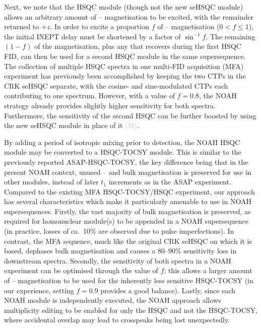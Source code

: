 \documentclass[11pt]{article}
\newcommand*{\carbon}{\ce{^{13}C}}
\newcommand*{\proton}{\ce{^{1}H}}
\newcommand*{\hl}[1]{\textcolor{Thistle}{#1}}
\newcommand*{\sitodo}{\hl{(SI)}}
\begin{document}
Next, we note that the HSQC module (though not the new seHSQC module) allows an arbitrary amount of \carbon{}--\proton{} magnetisation to be excited, with the remainder returned to $+z$.  In order to excite a proportion $f$ of \carbon{}--\proton{} magnetisation ($0 < f \leq 1$), the initial INEPT delay must be shortened by a factor of $\sin^{-1}f$.
The remaining $(1 - f)$ of the magnetisation, plus any that recovers during the first HSQC FID, can then be used for a second HSQC module in the same supersequence.
The collection of multiple HSQC spectra in one multi-FID acquisition (MFA) experiment has previously been accomplished by keeping the two CTPs in the CRK seHSQC separate, with the cosine- and sine-modulated CTPs each contributing to one spectrum.\autocite{ctphsqc}
However, with a value of $f = 0.8$, the NOAH strategy already provides slightly higher sensitivity for both spectra.
Furthermore, the sensitivity of the second HSQC can be further boosted by using the new seHSQC module in place of it \sitodo{}.

By adding a period of isotropic mixing prior to detection, the NOAH HSQC module may be converted to a HSQC-TOCSY module.
This is similar to the previously reported ASAP-HSQC-TOCSY,\autocite{Becker2019JMR} the key difference being that in the present NOAH context, unused \carbon{}--\proton{} and bulk magnetisation is preserved for use in other modules, instead of later $t_1$ increments as in the ASAP experiment.
Compared to the existing MFA HSQC-TOCSY/HSQC experiment,\autocite{Nolis2019CPC} our approach has several characteristics which make it particularly amenable to use in NOAH supersequences.
Firstly, the vast majority of bulk magnetisation is preserved, as required for homonuclear module(s) to be appended in a NOAH supersequence (in practice, losses of ca.\ 10\% are observed due to pulse imperfections).
In contrast, the MFA sequence, much like the original CRK seHSQC on which it is based, dephases bulk magnetisation and causes a 80--90\% sensitivity loss in downstream spectra.
Secondly, the sensitivity of both spectra in a NOAH experiment can be optimised through the value of $f$; this allows a larger amount of \carbon{}--\proton{} magnetisation to be used for the inherently less sensitive HSQC-TOCSY (in our experience, setting $f = 0.9$ provides a good balance).
Lastly, since each NOAH module is independently executed, the NOAH approach allows multiplicity editing to be enabled for only the HSQC and not the HSQC-TOCSY, where accidental overlap may lead to crosspeaks being lost unexpectedly.
\end{document}
